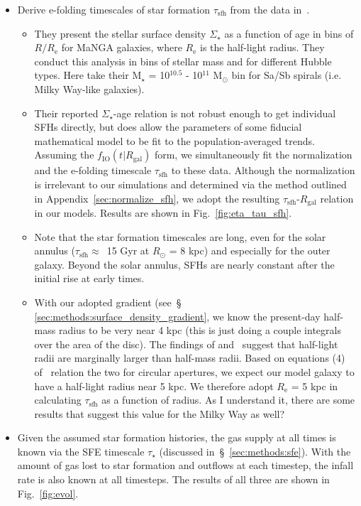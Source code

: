 \documentclass[fleqn, usenatbib]{mnras}
\begin{document}
\begin{itemize}
	\item Derive e-folding timescales of star formation $\tau_\text{sfh}$ 
	from the data in~\citet{Sanchez2020}. 
	\begin{itemize} 
		\item They present the stellar surface density $\Sigma_\star$ as a 
		function of age in bins of $R/R_\text{e}$ for MaNGA galaxies, where 
		$R_\text{e}$ is the half-light radius. They conduct this analysis in 
		bins of stellar mass and for different Hubble types. Here take their 
		M$_\star$ = 10$^{10.5}$ - 10$^{11}$ M$_\odot$ bin for Sa/Sb spirals 
		(i.e. Milky Way-like galaxies). 

		\item Their reported $\Sigma_\star$-age relation is not robust enough 
		to get individual SFHs directly, but does allow the parameters of some 
		fiducial mathematical model to be fit to the population-averaged 
		trends. Assuming the $f_\text{IO}(t|R_\text{gal})$ form, we 
		simultaneously fit the normalization and the e-folding timescale 
		$\tau_\text{sfh}$ to these data. Although the normalization is 
		irrelevant to our simulations and determined via the method outlined 
		in Appendix~\ref{sec:normalize_sfh}, we adopt the resulting 
		$\tau_\text{sfh}$-$R_\text{gal}$ relation in our models. Results are 
		shown in Fig.~\ref{fig:eta_tau_sfh}. 

		\item Note that the star formation timescales are long, even for the 
		solar annulus ($\tau_\text{sfh} \approx$~15 Gyr at $R_\odot$ = 8 kpc) 
		and especially for the outer galaxy. Beyond the solar annulus, SFHs are 
		nearly constant after the initial rise at early times. 

		\item With our adopted gradient (see~\S 
		\ref{sec:methods:surface_density_gradient}, we know the present-day 
		half-mass radius to be very near 4 kpc (this is just doing a couple 
		integrals over the area of the disc). The findings of 
		\citet{Garcia-Benito2017} and~\citet{GonzalezDelgado2014} suggest that 
		half-light radii are marginally larger than half-mass radii. Based on 
		equations (4) of~\citet{GonzalezDelgado2014} relation the two for 
		circular apertures, we expect our model galaxy to have a half-light 
		radius near 5 kpc. We therefore adopt $R_\text{e}$ = 5 kpc in 
		calculating $\tau_\text{sfh}$ as a function of radius. {\color{red} 
		As I understand it, there are some results that suggest this value for 
		the Milky Way as well?} 
	\end{itemize} 

	\item Given the assumed star formation histories, the gas supply at all 
	times is known via the SFE timescale $\tau_\star$ (discussed 
	in~\S~\ref{sec:methods:sfe}). With the amount of gas lost to star formation 
	and outflows at each timestep, the infall rate is also known at all 
	timesteps. The results of all three are shown in Fig.~\ref{fig:evol}. 
\end{itemize} 
\end{document}

